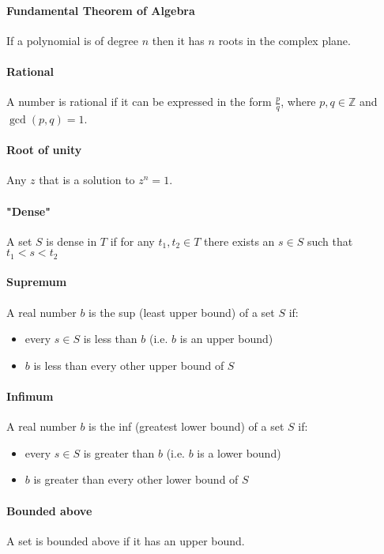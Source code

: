\documentclass{scrartcl}
\newcommand{\Z}{\mathbb{Z}}
\begin{document}
\paragraph{Fundamental Theorem of Algebra}
If a polynomial is of degree $ n $ then it has $ n $ roots in the complex plane.

\paragraph{Rational}
A number is rational if it can be expressed in the form $ \frac{p}{q} $, where $ p, q \in \Z $ and $ \gcd(p, q) = 1 $.

\paragraph{Root of unity}
Any $ z $ that is a solution to $ z^{n} = 1 $.

\paragraph{"Dense"}
A set $ S $ is dense in $ T $ if for any $ t_{1}, t_{2} \in T $ there exists an $ s \in S $ such that $ t_{1} < s < t_{2} $

\paragraph{Supremum}
A real number $ b $ is the sup (least upper bound) of a set $ S $ if:
\begin{itemize}
\item every $ s \in S $ is less than $ b $ (i.e. $ b $ is an upper bound)
\item $ b $ is less than every other upper bound of $ S $
\end{itemize}

\paragraph{Infimum}
A real number $ b $ is the inf (greatest lower bound) of a set $ S $ if:
\begin{itemize}
\item every $ s \in S $ is greater than $ b $ (i.e. $ b $ is a lower bound)
\item $ b $ is greater than every other lower bound of $ S $
\end{itemize}

\paragraph{Bounded above}
A set is bounded above if it has an upper bound.
\end{document}
